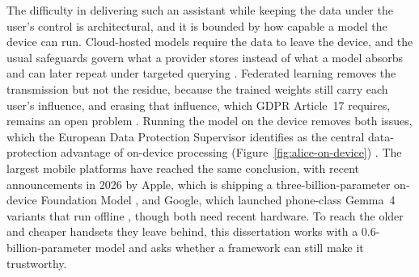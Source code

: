 The difficulty in delivering such an assistant while keeping the data under the user's control is architectural, and it is bounded by how capable a model the device can run. Cloud-hosted models require the data to leave the device, and the usual safeguards govern what a provider stores instead of what a model absorbs and can later repeat under targeted querying \cite{carlini2021extractingtrainingdatalarge}. Federated learning removes the transmission but not the residue, because the trained weights still carry each user's influence, and erasing that influence, which GDPR Article~17 requires, remains an open problem \cite{nguyen2026computationcommunicationefficientfederated, staufer2025llmsforgetquantifyingpersonal}. Running the model on the device removes both issues, which the European Data Protection Supervisor identifies as the central data-protection advantage of on-device processing (Figure~\ref{fig:alice-on-device}) \cite{edps2025ondeviceai}. The largest mobile platforms have reached the same conclusion, with recent announcements in 2026 by Apple, which is shipping a three-billion-parameter on-device Foundation Model \cite{apple2026afm3}, and Google, which launched phone-class Gemma~4 variants that run offline \cite{gemma4}, though both need recent hardware. To reach the older and cheaper handsets they leave behind, this dissertation works with a 0.6-billion-parameter model and asks whether a framework can still make it trustworthy.

